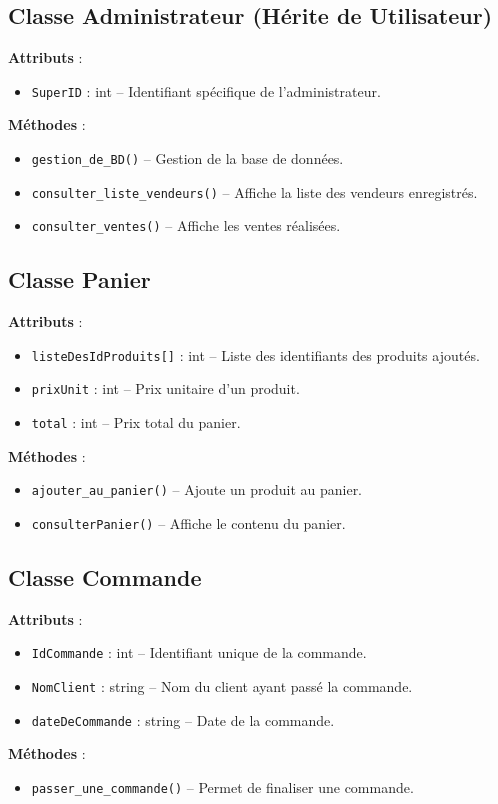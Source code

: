 \documentclass[a4paper,12pt]{article}
\begin{document}
\subsection{Classe Administrateur (Hérite de Utilisateur)}
\textbf{Attributs} :
\begin{itemize}
    \item \texttt{SuperID} : int – Identifiant spécifique de l'administrateur.
\end{itemize}
\textbf{Méthodes} :
\begin{itemize}
    \item \texttt{gestion\_de\_BD()} – Gestion de la base de données.
    \item \texttt{consulter\_liste\_vendeurs()} – Affiche la liste des vendeurs enregistrés.
    \item \texttt{consulter\_ventes()} – Affiche les ventes réalisées.
\end{itemize}

\subsection{Classe Panier}
\textbf{Attributs} :
\begin{itemize}
    \item \texttt{listeDesIdProduits[]} : int – Liste des identifiants des produits ajoutés.
    \item \texttt{prixUnit} : int – Prix unitaire d'un produit.
    \item \texttt{total} : int – Prix total du panier.
\end{itemize}
\textbf{Méthodes} :
\begin{itemize}
    \item \texttt{ajouter\_au\_panier()} – Ajoute un produit au panier.
    \item \texttt{consulterPanier()} – Affiche le contenu du panier.
\end{itemize}

\subsection{Classe Commande}
\textbf{Attributs} :
\begin{itemize}
    \item \texttt{IdCommande} : int – Identifiant unique de la commande.
    \item \texttt{NomClient} : string – Nom du client ayant passé la commande.
    \item \texttt{dateDeCommande} : string – Date de la commande.
\end{itemize}
\textbf{Méthodes} :
\begin{itemize}
    \item \texttt{passer\_une\_commande()} – Permet de finaliser une commande.
\end{itemize}
\end{document}
